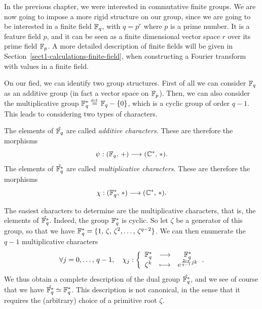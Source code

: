  
In the previous chapter, we were interested in commutative finite groups. We are now going to impose a more rigid structure on our group, since we are going to be interested in a finite field $ \mathbb{F}_q $, with $ q = p^r $ where $ p $ is a prime number. It is a feature field $ p $, and it can be seen as a finite dimensional vector space $ r $ over its prime field $ \mathbb{F}_p $. A more detailed description of finite fields will be given in Section~\ref{sect1-calculations-finite-field}, when constructing a Fourier transform with values in a finite field.
 
 
On our fied, we can identify two group structures. First of all we can consider $ \mathbb{F}_q $ as an additive group (in fact a vector space on $ \mathbb{F}_p $). Then, we can also consider the multiplicative group $ \mathbb{F}_q^* \stackrel{\mbox{\upshape\tiny def.}}{=} \mathbb{F}_q - \{0\} $, which is a cyclic group of order $ q-1 $. This leads to considering two types of characters.
 
\begin{defn}
  The elements of $ \hat{\mathbb{F}_q} $ are called \textit{additive characters}. These are therefore the morphisms
\begin{equation*}
\psi: (\mathbb{F}_q, \, +) \longrightarrow (\mathbb{C}^*, \, *).
\end{equation*}
The elements of $ \hat{\mathbb{F}_q^*} $ are called \textit{multiplicative characters}. These are therefore the morphisms
\begin{equation*}
\chi: (\mathbb{F}_q^*, \, *) \longrightarrow (\mathbb{C}^*, \, *).
\end{equation*}
\end{defn}
 
 
 
The easiest characters to determine are the multiplicative characters, that is, the elements of $ \hat{\mathbb{F}_q^*} $. Indeed, the group $ \mathbb{F}_q^* $ is cyclic. So let $ \zeta $ be a generator of this group, so that we have $ \mathbb{F}_q^* = \{1, \, \zeta, \, \zeta^2, \ldots, \, \zeta^{q-2}\} $. We can then enumerate the $ q-1 $ multiplicative characters
\begin{equation*}
\forall j = 0, \ldots, \, q-1, \quad \chi_j: {\left\{ \begin{array}{ccc} \mathbb{F}_q^* & \longrightarrow & \mathbb{F}_q^* \\ \zeta^k & \longmapsto & e^{\frac{2 \imath \pi}{q-1} jk} \end{array} \right.}.
\end{equation*}
We thus obtain a complete description of the dual group $ \hat{\mathbb{F}_q^*} $, and we see of course that we have $ \hat{\mathbb{F}_q^*} \simeq \mathbb{F}_q^* $. This description is not canonical, in the sense that it requires the (arbitrary) choice of a primitive root $ \zeta $.
 
